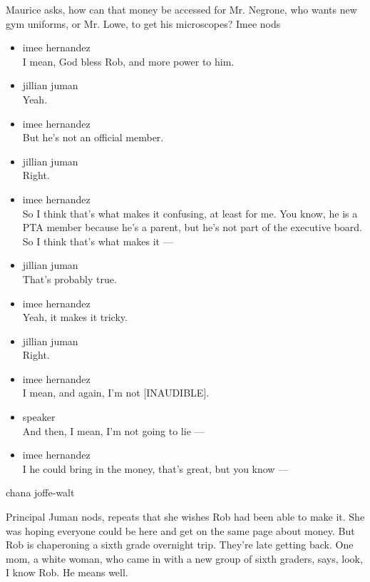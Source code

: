 Maurice asks, how can that money be accessed for Mr. Negrone, who wants
new gym uniforms, or Mr. Lowe, to get his microscopes? Imee nods

\begin{itemize}
\item
  imee hernandez\\
  I mean, God bless Rob, and more power to him.
\item
  jillian juman\\
  Yeah.
\item
  imee hernandez\\
  But he's not an official member.
\item
  jillian juman\\
  Right.
\item
  imee hernandez\\
  So I think that's what makes it confusing, at least for me. You know,
  he is a PTA member because he's a parent, but he's not part of the
  executive board. So I think that's what makes it ---
\item
  jillian juman\\
  That's probably true.
\item
  imee hernandez\\
  Yeah, it makes it tricky.
\item
  jillian juman\\
  Right.
\item
  imee hernandez\\
  I mean, and again, I'm not {[}INAUDIBLE{]}.
\item
  speaker\\
  And then, I mean, I'm not going to lie ---
\item
  imee hernandez\\
  I he could bring in the money, that's great, but you know ---
\end{itemize}

chana joffe-walt

Principal Juman nods, repeats that she wishes Rob had been able to make
it. She was hoping everyone could be here and get on the same page about
money. But Rob is chaperoning a sixth grade overnight trip. They're late
getting back. One mom, a white woman, who came in with a new group of
sixth graders, says, look, I know Rob. He means well.

